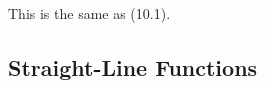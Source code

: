      \label{m39213*id189835}This is the same as (10.1).\par 
    \label{m39213*cid3}
            \subsection{ Straight-Line Functions}
            \nopagebreak
\label{m39213*secfhsst!!!underscore!!!id141}
